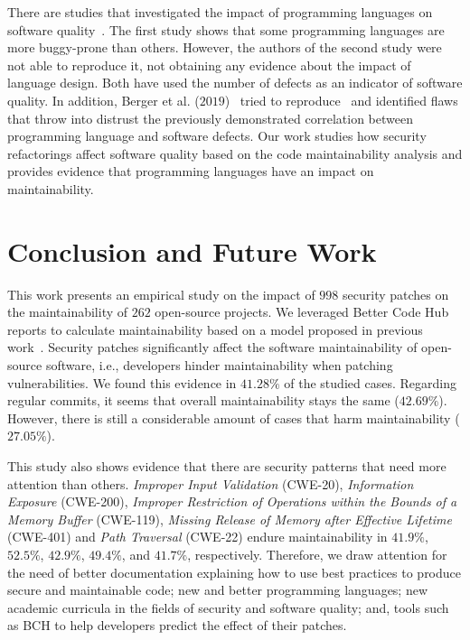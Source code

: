 \documentclass[10pt,conference]{IEEEtran}
\begin{document}
There are studies that investigated the impact of programming languages on software
quality~\cite{Ray:2014:LSS:2635868.2635922,Ray:2017:LSP:3144574.3126905}. The first
study shows that some programming languages are more buggy-prone than others. However,
the authors of the second study were not able to reproduce it, not obtaining any
evidence about the impact of language design. Both have used the number of
defects as an indicator of software quality. In addition,
Berger et al. ($2019$)~\cite{2019arXiv190110220B} tried to reproduce~\cite{Ray:2014:LSS:2635868.2635922,
Ray:2017:LSP:3144574.3126905} and identified flaws that throw into distrust the 
previously demonstrated correlation between programming language and software 
defects. Our work studies how security refactorings affect software quality based 
on the code maintainability analysis and provides evidence that programming languages 
have an impact on maintainability.

\section{Conclusion and Future Work}\label{sec:conclusions}

This work presents an empirical study on the impact of $998$ security
patches on the maintainability of $262$ open-source projects. We leveraged
Better Code Hub reports to calculate maintainability based on a model proposed in previous work~\cite{Olivari:2018, cruz2019energyoriented}. Security patches 
significantly affect the software maintainability of open-source software, i.e., 
developers hinder maintainability when patching vulnerabilities. We found this evidence in
$41.28\%$ of the studied cases. Regarding regular commits, it seems that overall
maintainability stays the same ($42.69\%$). However, there is still a 
considerable amount of cases that harm maintainability ($27.05\%$).

This study also shows evidence that there are security patterns that need more
attention than others. \emph{Improper Input Validation} (CWE-20), \emph{Information 
Exposure} (CWE-200), \emph{Improper Restriction of Operations within the Bounds of a 
Memory Buffer} (CWE-119), \emph{Missing Release of Memory after Effective Lifetime} 
(CWE-401) and \emph{Path Traversal} (CWE-22) endure maintainability
in $41.9\%$, $52.5\%$, $42.9\%$, $49.4\%$, and $41.7\%$, respectively. Therefore, 
we draw attention for the need of better documentation explaining how to use best practices to
produce secure and maintainable code; new and better programming languages; new
academic curricula in the fields of security and software quality; and, tools
such as BCH to help developers predict the effect of their patches.
\end{document}

